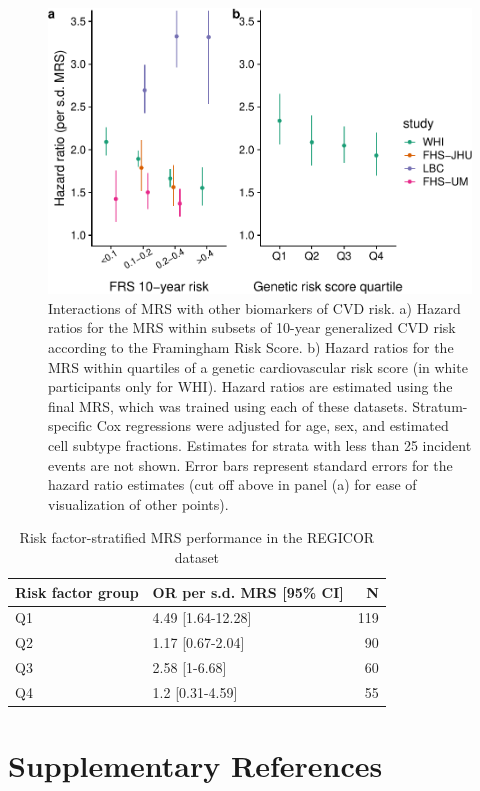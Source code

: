 \documentclass[]{article}
\begin{document}
\begin{figure}[h]
\includegraphics{figures/interactions-1} \caption{Interactions of MRS with other biomarkers of CVD risk. a) Hazard ratios for the MRS within subsets of 10-year generalized CVD risk according to the Framingham Risk Score. b) Hazard ratios for the MRS within quartiles of a genetic cardiovascular risk score (in white participants only for WHI). Hazard ratios are estimated using the final MRS, which was trained using each of these datasets. Stratum-specific Cox regressions were adjusted for age, sex, and estimated cell subtype fractions. Estimates for strata with less than 25 incident events are not shown. Error bars represent standard errors for the hazard ratio estimates (cut off above in panel (a) for ease of visualization of other points).}\label{fig:interactions}
\end{figure}

\begin{longtable}{llr}
\caption{\label{tab:regicor-interactions}Risk factor-stratified MRS performance in the REGICOR dataset}\\
\toprule
Risk factor group & OR per s.d. MRS [95\% CI] & N\\
\midrule
Q1 & 4.49 [1.64-12.28] & 119\\
Q2 & 1.17 [0.67-2.04] & 90\\
Q3 & 2.58 [1-6.68] & 60\\
Q4 & 1.2 [0.31-4.59] & 55\\
\bottomrule
\end{longtable}

\newpage

\hypertarget{supplementary-references}{%
\section*{Supplementary References}\label{supplementary-references}}
\end{document}
